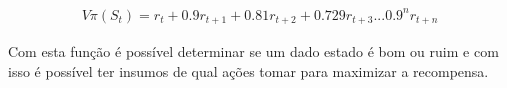 \begin{equation}
	\begin{aligned}
 			V\pi(S_{t})= r_{t} + 0.9 r_{t+1} + 0.81 r_{t+2} + 0.729 r_{t+3} ... 0.9^{n} r_{t+n}
	\end{aligned}
\end{equation}


Com esta função é possível determinar se um dado estado é bom ou ruim e com isso é possível ter insumos de qual
ações tomar para maximizar a recompensa.